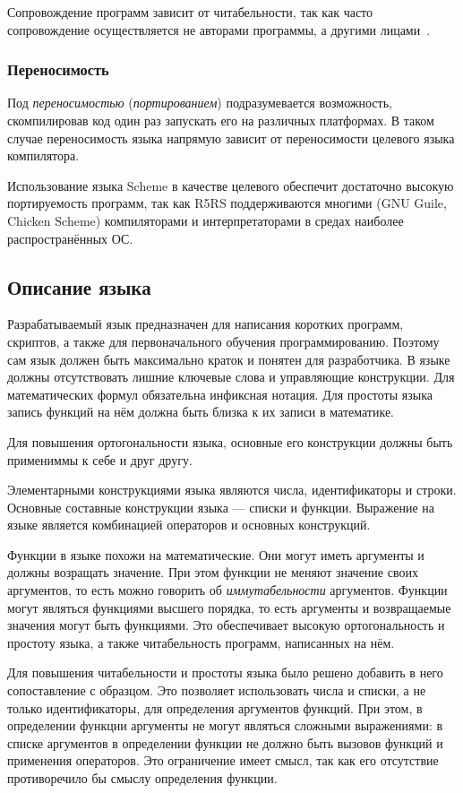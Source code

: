             Сопровождение программ зависит от читабельности, так как часто сопровождение осуществляется не авторами программы, а другими лицами~\cite{langs}.
        \subsubsection{Переносимость}
            Под \textit{переносимостью} (\textit{портированием}) подразумевается возможность, скомпилировав код один раз запускать его на различных платформах.
            В таком случае переносимость языка напрямую зависит от переносимости целевого языка компилятора.
    
            Использование языка Scheme в качестве целевого обеспечит достаточно высокую портируемость программ, так как R5RS поддерживаются многими (GNU Guile, Chicken Scheme) компиляторами и интерпретаторами в средах наиболее распространённых ОС.
    \subsection{Описание языка}
        Разрабатываемый язык предназначен для написания коротких программ, скриптов, а также для первоначального обучения программированию.
        Поэтому сам язык должен быть максимально краток и понятен для разработчика.
        В языке должны отсутствовать лишние ключевые слова и управляющие конструкции.
        Для математических формул обязательна инфиксная нотация.
        Для простоты языка запись функций на нём должна быть близка к их записи в математике.

        Для повышения ортогональности языка, основные его конструкции должны быть примениммы к себе и друг другу.

        Элементарными конструкциями языка являются числа, идентификаторы и строки.
        Основные составные конструкции языка --- списки и функции.
        Выражение на языке является комбинацией операторов и основных конструкций.

        Функции в языке похожи на математические.
        Они могут иметь аргументы и должны возращать значение.
        При этом функции не меняют значение своих аргументов, то есть можно говорить об \textit{иммутабельности} аргументов.
        Функции могут являться функциями высшего порядка, то есть аргументы и возвращаемые значения могут быть функциями.
        Это обеспечивает высокую ортогональность и простоту языка, а также читабельность программ, написанных на нём.

        Для повышения читабельности и простоты языка было решено добавить в него сопоставление с образцом.
        Это позволяет использовать числа и списки, а не только идентификаторы, для определения аргументов функций.
        При этом, в определении функции аргументы не могут являться сложными выражениями: в списке аргументов в определении функции не должно быть вызовов функций и применения операторов.
        Это ограничение имеет смысл, так как его отсутствие противоречило бы смыслу определения функции.

